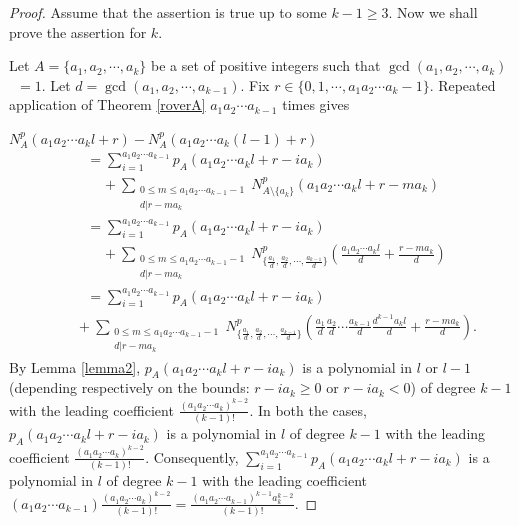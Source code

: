 \documentclass[11pt]{article}
\begin{document}
\begin{proof}
Assume that the assertion is true up to some $k-1\geq 3$. Now we shall prove the assertion for $k$. 

Let $A=\{a_1,a_2,\cdots ,a_k\}$ be a set of positive integers such that $\gcd(a_1,a_2,\cdots ,a_k)$\ $=1$. Let $d=\gcd(a_1,a_2,\cdots ,a_{k-1})$. Fix $r\in\{0,1,\cdots ,a_1a_2\cdots a_k-1\}$. Repeated application of Theorem \ref{roverA} $a_1a_2\cdots a_{k-1}$ times gives

$N_A^p(a_1a_2\cdots a_kl+r)-N_A^p(a_1a_2\cdots a_k(l-1)+r)$
\begin{align*}
&=\sum_{i=1}^{a_1a_2\cdots a_{k-1}}p_A(a_1a_2\cdots a_kl+r-ia_k)\\ &\ \ \ \ \ +\sum_{\substack{0\leq m\leq a_1a_2\cdots a_{k-1}-1\\ d|r-ma_k}}N_{A\setminus\{a_k\}}^p(a_1a_2\cdots a_kl+r-ma_k)\\
&=\sum_{i=1}^{a_1a_2\cdots a_{k-1}}p_A(a_1a_2\cdots a_kl+r-ia_k)\\ &\ \ \ \ \ +\sum_{\substack{0\leq m\leq a_1a_2\cdots a_{k-1}-1\\ d|r-ma_k}}N_{\{\frac{a_1}{d},\frac{a_2}{d},\cdots ,\frac{a_{k-1}}{d}\}}^p\left(\frac{a_1a_2\cdots a_kl}{d}+\frac{r-ma_k}{d}\right)\\
&=\sum_{i=1}^{a_1a_2\cdots a_{k-1}}p_A(a_1a_2\cdots a_kl+r-ia_k)
\end{align*}
\begin{align}\label{eqn2}
\ \ \ \ \ \ \ \ \ \  +\sum_{\substack{0\leq m\leq a_1a_2\cdots a_{k-1}-1\\ d|r-ma_k}}N_{\{\frac{a_1}{d},\frac{a_2}{d},\cdots ,\frac{a_{k-1}}{d}\}}^p\left(\frac{a_1}{d}\frac{a_2}{d}\cdots \frac{a_{k-1}}{d}\frac{d^{k-1}a_kl}{d}+\frac{r-ma_k}{d}\right).
\end{align}
By Lemma \ref{lemma2}, $p_A(a_1a_2\cdots a_kl+r-ia_k)$ is a polynomial in $l$ or $l-1$ (depending respectively on the bounds: $r-ia_k\geq 0$ or $r-ia_k<0$) of degree $k-1$ with the leading coefficient $\frac{(a_1a_2\cdots a_k)^{k-2}}{(k-1)!}$. In both the cases, $p_A(a_1a_2\cdots a_kl+r-ia_k)$ is  a polynomial in $l$ of degree $k-1$ with the leading coefficient $\frac{(a_1a_2\cdots a_k)^{k-2}}{(k-1)!}$. Consequently, $\sum_{i=1}^{a_1a_2\cdots a_{k-1}}p_A(a_1a_2\cdots a_kl+r-ia_k)$ is a polynomial in $l$ of degree $k-1$ with the leading coefficient $(a_1a_2\cdots a_{k-1})\frac{(a_1a_2\cdots a_k)^{k-2}}{(k-1)!}=\frac{(a_1a_2\cdots a_{k-1})^{k-1}a_k^{k-2}}{(k-1)!}$.


\end{proof}
\end{document}
